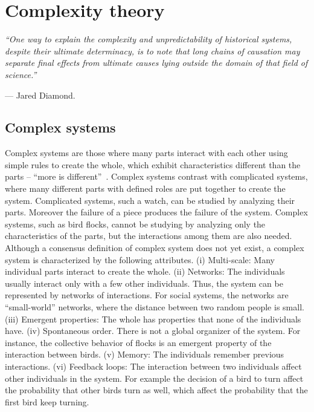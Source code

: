 

\section{Complexity theory}
\label{sec:complexity}
\textit{``One way to explain the complexity and unpredictability of historical systems, despite their ultimate determinacy, is to note that long chains of causation may separate final effects from ultimate causes lying outside the domain of that field of science.''}
\begin{flushright}
--- Jared Diamond.
\end{flushright}


\subsection{Complex systems}
\label{sec:characteristics}
Complex systems are those where many parts interact with each other using simple rules to create the whole,
which exhibit characteristics different than the parts --
``more is different''~\citep{anderson1972}.
Complex systems contrast with complicated systems, where many different parts with defined roles are put together to create the system. 
Complicated systems, such a watch, can be studied by analyzing their parts. 
Moreover the failure of a piece produces the failure of the system.
Complex systems, such as bird flocks, cannot be studying by analyzing only the characteristics of the parts, 
but the interactions among them are also needed.  
Although a consensus definition of complex system does not yet exist, a complex system is characterized by the following attributes. 
(i) Multi-scale: Many individual parts interact to create the whole. 
(ii) Networks: The individuals usually interact only with a few other individuals. Thus, the system can be represented by networks of interactions. For social systems, the networks are ``small-world'' networks, where the distance between two random people is small.  
(iii) Emergent properties: The whole has properties that none of the individuals have. 
(iv) Spontaneous order. There is not a global organizer of the system. For instance, the collective behavior of flocks is an emergent property of the interaction between birds. 
(v) Memory: The individuals remember previous interactions. 
(vi) Feedback loops: The interaction between two individuals affect other individuals in the system. For example the decision of a bird to turn affect the probability that other birds turn as well, which affect the probability that the first bird keep turning.
